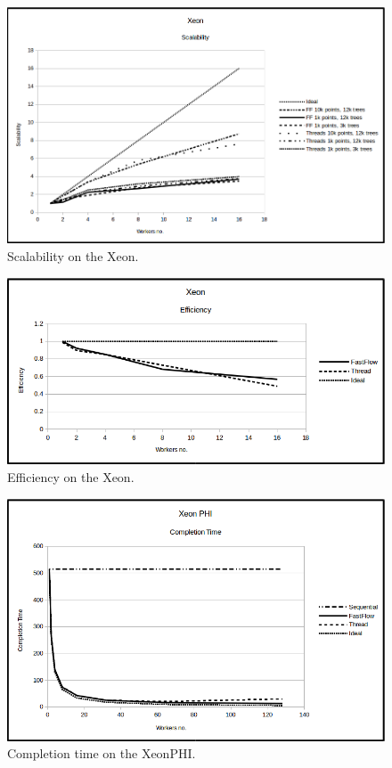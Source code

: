 \documentclass[10pt]{article}
\numberwithin{equation}{section}
\begin{document}
\begin{figure} 
\centering
\includegraphics[scale=.75]{Xeon_Scalability.png}
\caption{Scalability on the Xeon.}
\label{fig:xeonscalability}
\end{figure}

\begin{figure} 
\centering
\includegraphics[scale=.5]{Xeon_Efficiency.png}
\caption{Efficiency on the Xeon.}
\label{fig:xeonefficiency}
\end{figure}

\begin{figure} 
	\centering
	\includegraphics[scale=.5]{XeonPHI_CompletionTime.png}
	\caption{Completion time on the XeonPHI.}
	\label{fig:xeonphicompletiontime}
\end{figure}
\end{document}
